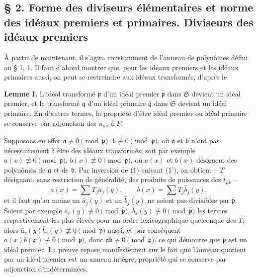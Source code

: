 \providecommand{\frakS}{\mathfrak S}
\providecommand{\fraka}{\mathfrak a}
\providecommand{\frakb}{\mathfrak b}
\providecommand{\frakc}{\mathfrak c}
\providecommand{\frakg}{\mathfrak g}
\providecommand{\frakG}{\mathfrak G}
\providecommand{\frakh}{\mathfrak h}
\providecommand{\frakm}{\mathfrak m}
\providecommand{\frakM}{\mathfrak M}
\providecommand{\frakn}{\mathfrak n}
\providecommand{\frako}{\mathfrak o}
\providecommand{\frakp}{\mathfrak p}
\providecommand{\frakq}{\mathfrak q}
\providecommand{\frakr}{\mathfrak r}
\providecommand{\barfrakm}{\overline{\mathfrak m}}

\subsection*{\S{} 2. Forme des diviseurs élémentaires et norme des idéaux premiers et primaires. Diviseurs des idéaux premiers}

À partir de maintenant, il s'agira constamment de l'anneau de polynômes défini au \S{} 1, 1. Il faut d'abord montrer que, pour les idéaux premiers et les idéaux primaires aussi, on peut se restreindre aux idéaux transformés, d'après le

\textbf{Lemme I.} L'idéal transformé $\frakp$ d'un idéal premier $\bar{\frakp}$ dans $\frakS$ devient un idéal premier, et le transformé $\frakq$ d'un idéal primaire $\bar{\frakq}$ dans $\frakS$ devient un idéal primaire. En d'autres termes, la propriété d'être idéal premier ou idéal primaire se conserve par adjonction des $u_{\mu\nu}$ à $P$.

Supposons en effet $\fraka\not\equiv0\pmod{\frakp}$, $\frakb\not\equiv0\pmod{\frakp}$, où $\fraka$ et $\frakb$ n'ont pas nécessairement à être des idéaux transformés; soit par exemple $a(x)\not\equiv0\pmod{\frakp}$, $b(x)\not\equiv0\pmod{\frakp}$, où $a(x)$ et $b(x)$ désignent des polynômes de $\fraka$ et de $\frakb$. Par inversion de (1) suivant (1'), on obtient -- $T$ désignant, sans restriction de généralité, des produits de puissances des $t_{\mu\nu}$ --
\[
 a(x)=\sum T_j \bar a_j(y),\qquad b(x)=\sum T_j \bar b_j(y),
\]
et il faut qu'au moins un $\bar a_j(y)$ et un $\bar b_j(y)$ ne soient pas divisibles par $\bar{\frakp}$. Soient par exemple $\bar a_r(y)\not\equiv0\pmod{\bar{\frakp}}$, $\bar b_s(y)\not\equiv0\pmod{\bar{\frakp}}$ les termes respectivement les plus élevés pour un ordre lexicographique quelconque des $T$; alors $\bar a_r(y)\bar b_s(y)\not\equiv0\pmod{\bar{\frakp}}$ aussi, et par conséquent $a(x)b(x)\not\equiv0\pmod{\frakp}$, donc $\fraka\frakb\not\equiv0\pmod{\frakp}$, ce qui démontre que $\frakp$ est un idéal premier. La preuve repose manifestement sur le fait que l'anneau quotient par un idéal premier est un anneau intègre, propriété qui se conserve par adjonction d'indéterminées.

